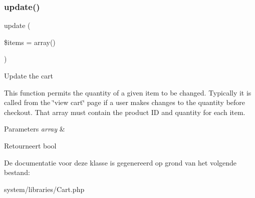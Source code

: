 \subsubsection{\texorpdfstring{update()}{update()}}
{\footnotesize\ttfamily update (\begin{DoxyParamCaption}\item[{}]{\$items = {\ttfamily array()} }\end{DoxyParamCaption})}

Update the cart

This function permits the quantity of a given item to be changed. Typically it is called from the \char`\"{}view cart\char`\"{} page if a user makes changes to the quantity before checkout. That array must contain the product ID and quantity for each item.


\begin{DoxyParams}{Parameters}
{\em array} & \\
\hline
\end{DoxyParams}
\begin{DoxyReturn}{Retourneert}
bool 
\end{DoxyReturn}


De documentatie voor deze klasse is gegenereerd op grond van het volgende bestand\+:\begin{DoxyCompactItemize}
\item 
system/libraries/Cart.\+php\end{DoxyCompactItemize}
